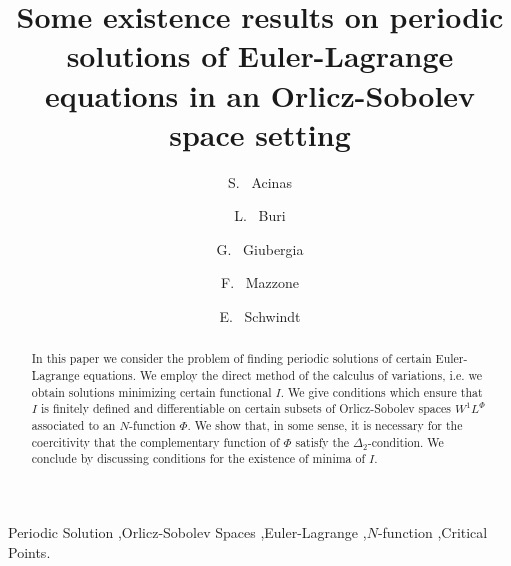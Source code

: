 \documentclass[twoside]{elsarticle}
\theoremstyle{remark}
\begin{document}
\begin{frontmatter}
\title{Some existence results on periodic solutions of 
Euler-Lagrange equations in an Orlicz-Sobolev space setting}



\author[imasl,unlpam]{S. ~Acinas }
\author[unrc]{L. ~Buri }
\author[unrc]{G. ~Giubergia}
\author[unrc]{F. ~Mazzone }
\author[mapmo]{E. ~Schwindt }


\address[imasl]{Instituto de Matem\'atica Aplicada San Luis (CONICET-UNSL),\\
(5700) San Luis, Argentina.  }

\address[unlpam]{Universidad Nacional de La Pampa,
(6300) Santa Rosa, La Pampa, Argentina.  }

\address[unrc]{Dpto. de Matem\'atica, Facultad de Ciencias Exactas, F\'{\i}sico-Qu\'{\i}micas y Naturales,
Universidad Nacional de R\'{i}o Cuarto,
(5800) R\'{\i}o Cuarto, C\'ordoba, Argentina. }


\address[mapmo]{Universit\'{e} d'{O}rl\'{e}ans, Laboratoire MAPMO, CNRS, UMR 7349, F\'ed\'eration Denis Poisson, FR 2964,
B\^{a}timent de Math\'{e}matiques, BP 6759, 45067 Orl\'{e}ans Cedex 2, France.
}


\begin{abstract}
In this paper we consider the problem of finding periodic solutions of certain Euler-Lagrange equations. We employ the direct method of the calculus of variations, i.e. we obtain solutions minimizing certain functional $I$. We give conditions which ensure that $I$ is finitely defined and differentiable on certain subsets of  Orlicz-Sobolev spaces $W^1L^{\Phi}$ associated to an $N$-function $\Phi$. We show that, in some sense, it is necessary for the coercitivity that  the complementary function of $\Phi$ satisfy the $\Delta_2$-condition.  We conclude by discussing conditions for the existence of minima of $I$. 
\end{abstract}

\begin{keyword}
Periodic Solution \sep Orlicz-Sobolev Spaces \sep  Euler-Lagrange  \sep $N$-function   \sep Critical Points.   
\end{keyword}

\end{frontmatter}
\end{document}
